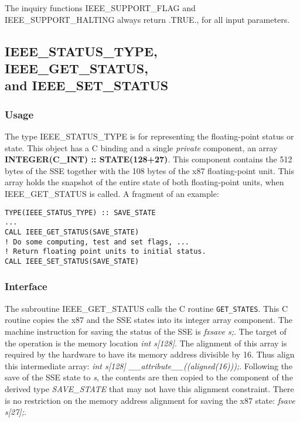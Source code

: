 \documentclass[12pt]{article}
\begin{document}
The inquiry functions IEEE\_SUPPORT\_FLAG and IEEE\_SUPPORT\_HALTING always return .TRUE.,
for all  input parameters.

\subsection{ IEEE\_STATUS\_TYPE, IEEE\_GET\_STATUS,\\  and IEEE\_SET\_STATUS}
\subsubsection{Usage}
The type IEEE\_STATUS\_TYPE is for representing the floating-point status or state.  This object has  a
C binding and a single {\it private} component, an array {\bf INTEGER(C\_INT) :: STATE(128+27)}.  This component contains  the 512 bytes of the SSE together with the 108 bytes of the x87  floating-point unit.
This array holds the  snapshot of the entire state of both floating-point units,  when
IEEE\_GET\_STATUS is called.  A fragment of an example:

{\tt TYPE(IEEE\_STATUS\_TYPE) :: SAVE\_STATE\\
       ...\\
       CALL IEEE\_GET\_STATUS(SAVE\_STATE)\\
! Do some computing, test and set flags, ...\\
! Return floating point units to initial status.\\
      CALL IEEE\_SET\_STATUS(SAVE\_STATE)\\ 
 }

\subsubsection{Interface}

The subroutine  IEEE\_GET\_STATUS calls the C routine {\tt GET\_STATES}.  This C routine copies
the x87 and the SSE states into its integer array component.
The machine instruction for saving the status of the SSE is {\it fxsave s;}.  The
target of the operation is the memory location {\it int s[128]}.  The alignment of this
array is required by the hardware to have its memory address divisible by 16.  Thus align this
intermediate array: {\it int s[128] \_\_attribute\_\_((aligned(16)));}.  Following the save of
the SSE state to {\it s}, the contents are then copied to the component of the derived type
{\it SAVE\_STATE} that may not have this alignment constraint.  There is no restriction on the memory address 
alignment for saving the x87 state: {\it fsave s[27];}.
\end{document}
